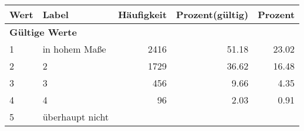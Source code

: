      \begin{longtable}{lXrrr}
     \toprule
     \textbf{Wert} & \textbf{Label} & \textbf{Häufigkeit} & \textbf{Prozent(gültig)} & \textbf{Prozent} \\
     \endhead
     \midrule
     \multicolumn{5}{l}{\textbf{Gültige Werte}}\\

     1 &
     \multicolumn{1}{X}{ in hohem Maße   } &


       \num{2416} &
       \num[round-mode=places,round-precision=2]{51.18} &
         \num[round-mode=places,round-precision=2]{23.02} \\

     2 &
     \multicolumn{1}{X}{ 2   } &


       \num{1729} &
       \num[round-mode=places,round-precision=2]{36.62} &
         \num[round-mode=places,round-precision=2]{16.48} \\

     3 &
     \multicolumn{1}{X}{ 3   } &


       \num{456} &
       \num[round-mode=places,round-precision=2]{9.66} &
         \num[round-mode=places,round-precision=2]{4.35} \\

     4 &
     \multicolumn{1}{X}{ 4   } &


       \num{96} &
       \num[round-mode=places,round-precision=2]{2.03} &
         \num[round-mode=places,round-precision=2]{0.91} \\

     5 &
     \multicolumn{1}{X}{ überhaupt nicht   } &



\end{longtable}

